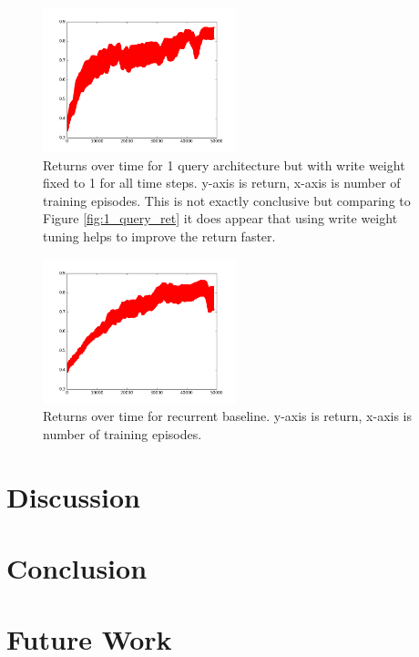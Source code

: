 \documentclass{article}
\begin{document}
\begin{figure}[!ht]
\center
\includegraphics[width=0.5\textwidth]{images/1_query_mem_ret_no_write.png}
\caption{Returns over time for 1 query architecture but with write weight fixed to 1 for all time steps. y-axis is return, x-axis is number of training episodes. This is not exactly conclusive but comparing to Figure \ref{fig:1_query_ret} it does appear that using write weight tuning helps to improve the return faster.}
\label{fig:1_query_no_write}
\end{figure}

\begin{figure}[!ht]
\center
\includegraphics[width=0.5\textwidth]{images/recurrent_ret.png}
\caption{Returns over time for recurrent baseline. y-axis is return, x-axis is number of training episodes.}
\label{fig:recurrent}
\end{figure}

\section*{Discussion}

\section*{Conclusion}

\section*{Future Work}
\end{document}

